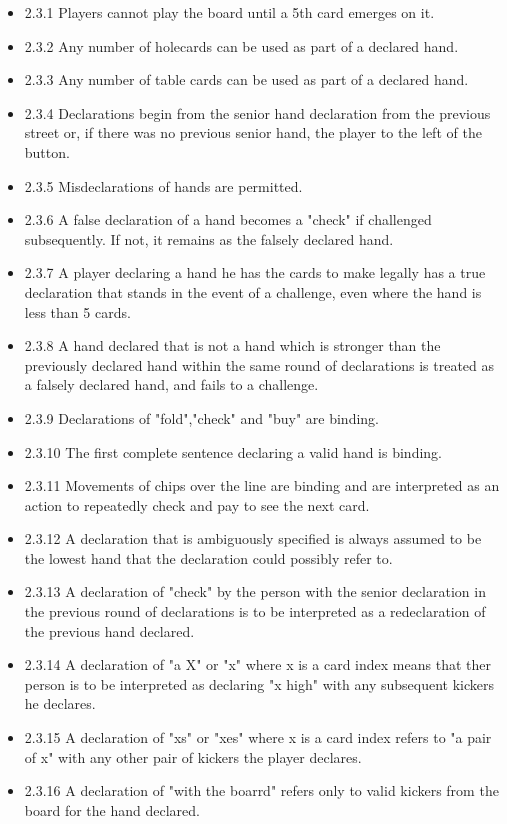 \documentclass[a4paper,12pt]{article}
\begin{document}
\begin{itemize}
\item 2.3.1 Players cannot play the board until a 5th card emerges on it.
\item 2.3.2 Any number of holecards can be used as part of a declared hand.
\item 2.3.3 Any number of table cards can be used as part of a declared hand.
\item 2.3.4 Declarations begin from the senior hand declaration from the previous street or, if there was no previous senior hand, the player to the left of the button.
\item 2.3.5 Misdeclarations of hands are permitted.
\item 2.3.6 A false declaration of a hand becomes a "check" if challenged subsequently. If not, it remains as the falsely declared hand.
\item 2.3.7 A player declaring a hand he has the cards to make legally has a true declaration that stands in the event of a challenge, even where the hand is less than 5 cards.
\item 2.3.8 A hand declared that is not a hand which is stronger than the previously declared hand within the same round of declarations is treated as a falsely declared hand, and fails to a challenge.
\item 2.3.9 Declarations of "fold","check" and "buy" are binding.
\item 2.3.10 The first complete sentence declaring a valid hand is binding.
\item 2.3.11 Movements of chips over the line are binding and are interpreted as an action to repeatedly check and pay to see the next card.
\item 2.3.12 A declaration that is ambiguously specified is always assumed to be the lowest hand that the declaration could possibly refer to.
\item 2.3.13 A declaration of "check" by the person with the senior declaration in the previous round of declarations is to be interpreted as a redeclaration of the previous hand declared.
\item 2.3.14 A declaration of "a X" or "x" where x is a card index means that ther person is to be interpreted as declaring "x high" with any subsequent kickers he declares.
\item 2.3.15 A declaration of "xs" or "xes" where x is a card index refers to "a pair of x" with any other pair of kickers the player declares.
\item 2.3.16 A declaration of "with the boarrd" refers only to valid kickers from the board for the hand declared.

\end{itemize}
\end{document}
